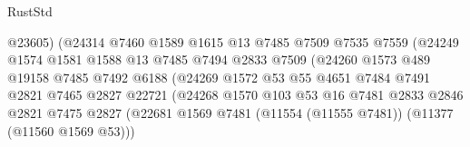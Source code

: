 \begin{lexlean}{RustStd}
\begin{coremodule}
                                      @23605)
                                    (@24314
                                      @7460
                                      @1589
                                      @1615
                                      @13
                                      @7485
                                      @7509
                                      @7535
                                      @7559
                                      (@24249
                                        @1574
                                        @1581
                                        @1588
                                        @13
                                        @7485
                                        @7494
                                        @2833
                                        @7509
                                        (@24260
                                          @1573
                                          @489
                                          @19158
                                          @7485
                                          @7492
                                          @6188
                                          (@24269
                                            @1572
                                            @53
                                            @55
                                            @4651
                                            @7484
                                            @7491
                                            @2821
                                            @7465
                                            @2827
                                            @22721
                                            (@24268
                                              @1570
                                              @103
                                              @53
                                              @16
                                              @7481
                                              @2833
                                              @2846
                                              @2821
                                              @7475
                                              @2827
                                              (@22681
                                                @1569
                                                @7481
                                                (@11554 (@11555 @7481))
                                                (@11377 (@11560 @1569 @53)))

\end{coremodule}
\end{lexlean}
